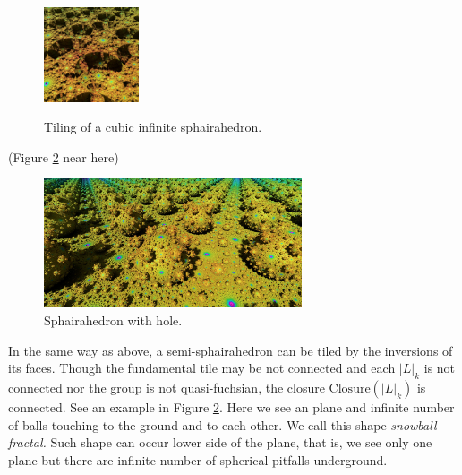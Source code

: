 \documentclass[suppldata, dvipdfmx]{interact}
\theoremstyle{plain}%
\theoremstyle{definition}
\theoremstyle{remark}
\theoremstyle{problemstyle}
\begin{document}
\begin{figure}[h!tbp]
\begin{minipage}[t]{0.18\textwidth}
  \label{fig:terrainStep20}
 \end{minipage}
 \hspace*{\fill}
 \begin{minipage}[t]{0.18\textwidth}
  \centering
  \includegraphics[height=1.1in, keepaspectratio]{./img/constructFractal/terrainProcess/final.jpg}
  \label{fig:sphairaPrismFinal}
 \end{minipage}
 \caption{Tiling of a cubic infinite sphairahedron.}
 \label{fig:sphairahedralPrismTile}
\end{figure}

(Figure \ref{fig:semiSphairaSpheres} near here)
\begin{figure}[h!tbp]
  \centering
 \includegraphics[width=3in,
 keepaspectratio]{./img/constructFractal/semi-terrain.jpg}
 \caption{Sphairahedron with hole.}
  \label{fig:semiSphairaSpheres}
\end{figure}

In the same way as above, a semi-sphairahedron
can be tiled by the inversions of its faces.
Though the fundamental tile may be not connected and each $|L|_k$ is not connected nor the group is not quasi-fuchsian, the closure $\text{Closure}(|L|_k)$ is connected.  
See an example in Figure \ref{fig:semiSphairaSpheres}.  Here we see an plane and infinite number of balls touching to the ground and to each other.  We call this shape {\it snowball fractal.}  Such shape can occur lower side of the plane, that is, we see only one plane but there are infinite number of spherical pitfalls underground.
\end{document}
